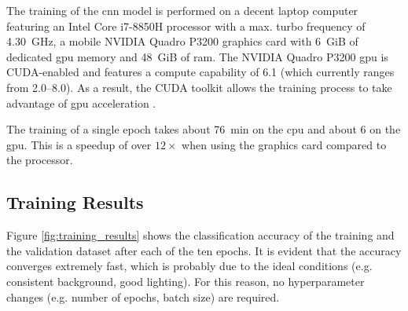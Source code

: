 The training of the \acrshort{cnn} model is performed on a decent laptop computer featuring an Intel Core i7-8850H processor with a max. turbo frequency of \SI{4.30}{GHz}, a mobile NVIDIA Quadro P3200 graphics card with \SI{6}{GiB} of dedicated \acrshort{gpu} memory and \SI{48}{GiB} of \acrshort{ram}.
The NVIDIA Quadro P3200 \acrshort{gpu} is CUDA-enabled and features a compute capability of \num{6.1} (which currently ranges from \numrange{2.0}{8.0}).
As a result, the CUDA toolkit allows the training process to take advantage of \acrshort{gpu} acceleration \cite{}. %

The training of a single epoch takes about \SI{76}{min} on the \acrshort{cpu} and about \SI{6}{\min} on the \acrshort{gpu}.
This is a speedup of over $12\times$ when using the graphics card compared to the processor.

\subsection{Training Results}
\label{subsec:training_of_the_cnn:training:training_results}
Figure \ref{fig:training_results} shows the classification accuracy of the training and the validation dataset after each of the ten epochs.
It is evident that the accuracy converges extremely fast, which is probably due to the ideal conditions (e.g. consistent background, good lighting).
For this reason, no hyperparameter changes (e.g. number of epochs, batch size) are required.


